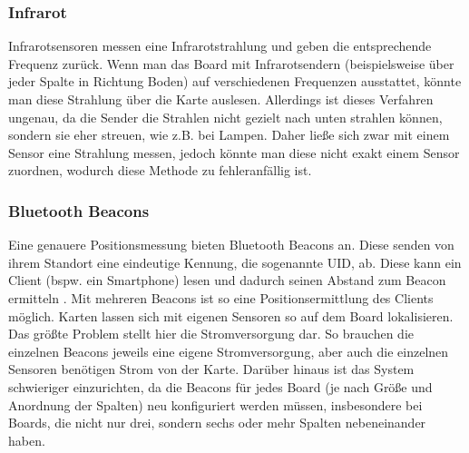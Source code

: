 \documentclass[12pt,titlepage]{scrartcl}
\begin{document}
			\subsubsection{Infrarot}
			Infrarotsensoren messen eine Infrarotstrahlung und geben die entsprechende Frequenz zurück. Wenn man das Board mit Infrarotsendern (beispielsweise über jeder Spalte in Richtung Boden) auf verschiedenen Frequenzen ausstattet, könnte man diese Strahlung über die Karte auslesen. Allerdings ist dieses Verfahren ungenau, da die Sender die Strahlen nicht gezielt nach unten strahlen können, sondern sie eher streuen, wie z.B. bei Lampen. Daher ließe sich zwar mit einem Sensor eine Strahlung messen, jedoch könnte man diese nicht exakt einem Sensor zuordnen, wodurch diese Methode zu fehleranfällig ist.
			\subsubsection{Bluetooth Beacons}
			Eine genauere Positionsmessung bieten Bluetooth Beacons an. Diese senden von ihrem Standort eine eindeutige Kennung, die sogenannte UID, ab. Diese kann ein Client (bspw. ein Smartphone) lesen und dadurch seinen Abstand zum Beacon ermitteln \cite{bluetoothspecs}. Mit mehreren Beacons ist so eine Positionsermittlung des Clients möglich. Karten lassen sich mit eigenen Sensoren so auf dem Board lokalisieren. Das größte Problem stellt hier die Stromversorgung dar. So brauchen die einzelnen Beacons jeweils eine eigene Stromversorgung, aber auch die einzelnen Sensoren benötigen Strom von der Karte. Darüber hinaus ist das System schwieriger einzurichten, da die Beacons für jedes Board (je nach Größe und Anordnung der Spalten) neu konfiguriert werden müssen, insbesondere bei Boards, die nicht nur drei, sondern sechs oder mehr Spalten nebeneinander haben.
\end{document}
